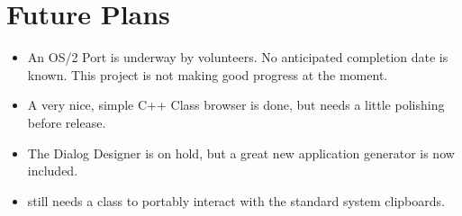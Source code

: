 \section {Future Plans}

\begin{itemize}

\item An OS/2 Port is underway by volunteers. No anticipated completion
date is known. This project is not making good progress at the moment.

\item A very nice, simple C++ Class browser is done, but
needs a little polishing before release. 

\item The Dialog Designer is on hold, but a great new
application generator is now included.

\item \V still needs a class to portably interact with the standard system
clipboards.

\end{itemize}
